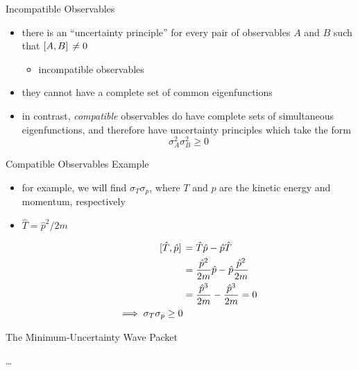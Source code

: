 \documentclass[ignorenonframetext,]{beamer}
\begin{document}
\begin{frame}{Incompatible Observables}

\begin{itemize}
\itemsep1pt\parskip0pt
\item
  there is an ``uncertainty principle'' for every pair of observables
  \(A\) and \(B\) such that \(\comm*{A}{B} \neq 0\)

  \begin{itemize}
  \itemsep1pt\parskip0pt
  \item
    incompatible observables
  \end{itemize}
\item
  they cannot have a complete set of common eigenfunctions
\item
  in contrast, \emph{compatible} observables do have complete sets of
  simultaneous eigenfunctions, and therefore have uncertainty principles
  which take the form \[\sigma_A^2 \sigma_B^2 \ge 0\]
\end{itemize}

\end{frame}

\begin{frame}{Compatible Observables Example}

\begin{itemize}
\itemsep1pt\parskip0pt
\item
  for example, we will find \(\sigma_T \sigma_p\), where \(T\) and \(p\)
  are the kinetic energy and momentum, respectively
\item
  \(\hat{T} = \hat{p}^2 / 2m\)

  \begin{align*}
    \comm*{\hat{T}}{\hat{p}} &=
    \hat{T}\hat{p} - \hat{p}\hat{T}
    \\ &=
    \frac{\hat{p}^2}{2 m} \hat{p} - \hat{p} \frac{\hat{p}^2}{2 m}
    \\ &=
    \frac{\hat{p}^3}{2 m} - \frac{\hat{p}^3}{2 m} = 0
    \\ \implies
    \sigma_T \sigma_p \geq 0
  \end{align*}
\end{itemize}

\end{frame}

\begin{frame}{The Minimum-Uncertainty Wave Packet}

\ldots{}

\end{frame}
\end{document}
